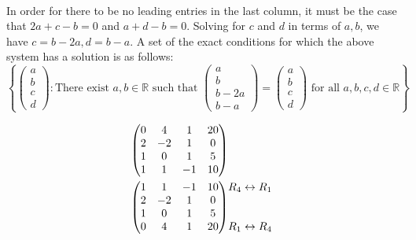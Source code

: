 \documentclass[12pt]{article}
\newenvironment{problem}[2][Problem]
{
	\begin{trivlist} 
		\item[\hskip \labelsep {\bfseries #1 #2:}]
	}
{
	\end{trivlist}
	}
\newenvironment{solution}[1][Solution]
{
	\begin{trivlist} 
		\item[\hskip \labelsep {\itshape #1:}]
	}
	{
	\end{trivlist}
}
\begin{document}
\begin{problem}{6}
\begin{solution}
\begin{align*}
\end{align*}
In order for there to be no leading entries in the last column, it must be the case that $2a+c-b=0$ and $a+d-b=0$. Solving for $c$ and $d$ in terms of $a,b$, we have $c=b-2a, d=b-a$. A set of the exact conditions for which the above system has a solution is as follows:
\[
\left\{ \begin{pmatrix}a\\b\\c\\d\end{pmatrix}: \text{There exist } a,b \in \mathbb{R} \text{ such that } \begin{pmatrix}a\\b\\b-2a\\b-a\end{pmatrix} = \begin{pmatrix}a\\b\\c\\d\end{pmatrix} \text{ for all $a,b,c,d \in \mathbb{R}$} \right\}
\]
\end{solution}
%
%
%
\newpage
\begin{align*}
\begin{pmatrix} 0&4&1&20\\2&-2&1&0\\1&0&1&5\\1&1&-1&10\end{pmatrix}
&\begin{matrix} 
\hphantom{1}\\
\hphantom{1}\\
\hphantom{1}\\
\hphantom{1}
\end{matrix}\\
%
%
%
\begin{pmatrix} 1&1&-1&10\\2&-2&1&0\\1&0&1&5\\0&4&1&20\end{pmatrix}
&\begin{matrix} 
R_4 \leftrightarrow R_1
\hphantom{1}\\
\hphantom{1}\\
\hphantom{1}\\
R_1 \leftrightarrow R_4
\hphantom{1}
\end{matrix}\\

\end{align*}
\end{problem}
\end{document}
